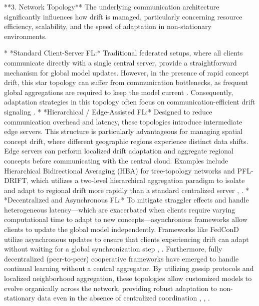 \documentclass[journal]{IEEEtran}
\begin{document}
**3. Network Topology**
The underlying communication architecture significantly influences how drift is managed, particularly concerning resource efficiency, scalability, and the speed of adaptation in non-stationary environments.

*   *Standard Client-Server FL:* Traditional federated setups, where all clients communicate directly with a single central server, provide a straightforward mechanism for global model updates. However, in the presence of rapid concept drift, this star topology can suffer from communication bottlenecks, as frequent global aggregations are required to keep the model current \cite{Abozaid2025}. Consequently, adaptation strategies in this topology often focus on communication-efficient drift signaling \cite{Gutierrez2024}.
*   *Hierarchical / Edge-Assisted FL:* Designed to reduce communication overhead and latency, these topologies introduce intermediate edge servers. This structure is particularly advantageous for managing spatial concept drift, where different geographic regions experience distinct data shifts. Edge servers can perform localized drift adaptation and aggregate regional concepts before communicating with the central cloud. Examples include Hierarchical Bidirectional Averaging (HBA) for tree-topology networks \cite{Hemadasa2025} and PFL-DRIFT, which utilizes a two-level hierarchical aggregation paradigm to isolate and adapt to regional drift more rapidly than a standard centralized server \cite{Aziz2025a}, \cite{Aziz2025}.
*   *Decentralized and Asynchronous FL:* To mitigate straggler effects and handle heterogeneous latency—which are exacerbated when clients require varying computational time to adapt to new concepts—asynchronous frameworks allow clients to update the global model independently. Frameworks like FedConD utilize asynchronous updates to ensure that clients experiencing drift can adapt without waiting for a global synchronization step \cite{Chen2021}, \cite{Chen2021a}. Furthermore, fully decentralized (peer-to-peer) cooperative frameworks have emerged to handle continual learning without a central aggregator. By utilizing gossip protocols and localized neighborhood aggregation, these topologies allow customized models to evolve organically across the network, providing robust adaptation to non-stationary data even in the absence of centralized coordination \cite{Yang2025}, \cite{Lanza2025}, \cite{paper130}.
\end{document}
